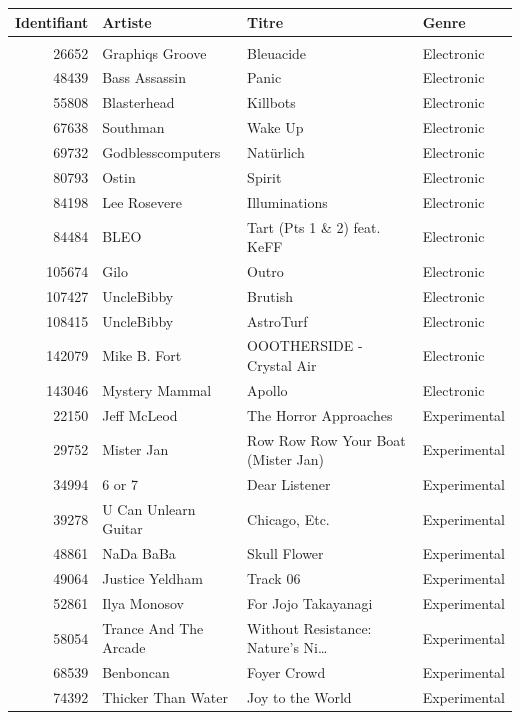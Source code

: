 \begin{footnotesize}
\begin{longtable}{@{}rlll@{}}
\toprule Identifiant & Artiste & Titre & Genre \\ \midrule \endhead
\bottomrule \endfoot
\multicolumn{4}{@{}l}{\textbf{Morceaux de la base (100)}} \\ \midrule
26652 & Graphiqs Groove & Bleuacide & Electronic \\
48439 & Bass Assassin & Panic & Electronic \\
55808 & Blasterhead & Killbots & Electronic \\
67638 & Southman & Wake Up & Electronic \\
69732 & Godblesscomputers & Natürlich & Electronic \\
80793 & Ostin & Spirit & Electronic \\
84198 & Lee Rosevere & Illuminations & Electronic \\
84484 & BLEO & Tart (Pts 1 \& 2) feat. KeFF & Electronic \\
105674 & Gilo & Outro & Electronic \\
107427 & UncleBibby & Brutish & Electronic \\
108415 & UncleBibby & AstroTurf & Electronic \\
142079 & Mike B. Fort & OOOTHERSIDE - Crystal Air & Electronic \\
143046 & Mystery Mammal & Apollo & Electronic \\
22150 & Jeff McLeod & The Horror Approaches & Experimental \\
29752 & Mister Jan & Row Row Row Your Boat (Mister Jan) & Experimental \\
34994 & 6 or 7 & Dear Listener & Experimental \\
39278 & U Can Unlearn Guitar & Chicago, Etc. & Experimental \\
48861 & NaDa BaBa & Skull Flower & Experimental \\
49064 & Justice Yeldham & Track 06 & Experimental \\
52861 & Ilya Monosov & For Jojo Takayanagi & Experimental \\
58054 & Trance And The Arcade & Without Resistance: Nature's Ni\ldots & Experimental \\
68539 & Benboncan & Foyer Crowd & Experimental \\
74392 & Thicker Than Water & Joy to the World & Experimental \\

\end{longtable}
\end{footnotesize}
